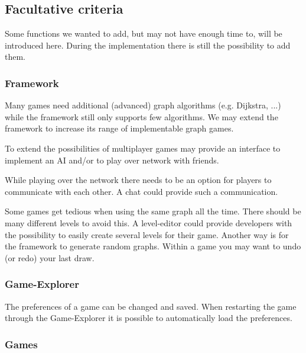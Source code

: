 \subsection{Facultative criteria}\label{REF:FACULTATIVE-CRITERIA}
Some functions we wanted to add, but may not have enough time to, will be introduced here. During the implementation there is still the possibility to add them.

\subsubsection{Framework}
Many \glspl{game} need additional (advanced) \gls{graph} \glspl{algorithm} (e.g. Dijkstra, ...)	while the \gls{framework} still only supports few algorithms. We may extend the framework to increase its range of implementable graph games. \par
To extend the possibilities of multiplayer games {\graphioli} may provide an interface to implement an \gls{AI} and/or to play over network with friends. \par
While playing over the network there needs to be an option for players to communicate with each other. A \gls{chat} could provide such a communication. \par
Some games get tedious when using the same graph all the time. There should be many different \glspl{level} to avoid this. A \gls{level-editor} could provide \glspl{developer} with the possibility to easily create several levels for their game. Another way is for the framework to generate random graphs.
Within a game you may want to \gls{undo} (or \gls{redo}) your last draw.

\subsubsection{Game-Explorer}
The preferences of a game can be changed and saved. When restarting the game through the Game-Explorer it is possible to automatically load the preferences. \\

\subsubsection{Games}
